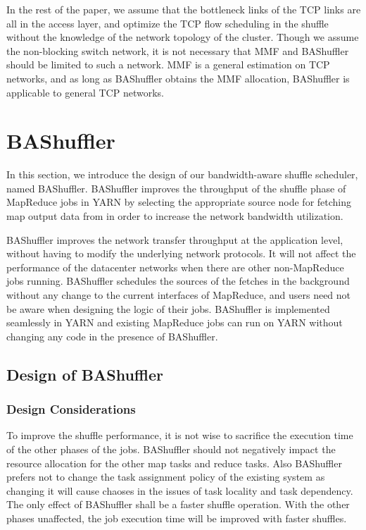 \documentclass[10pt,journal,compsoc]{IEEEtran}
\begin{document}
In the rest of the paper, we assume that the bottleneck links of the
TCP links are all in the access layer,
and optimize the TCP flow scheduling in the shuffle without the
knowledge of the network topology of the cluster.
Though we assume the non-blocking switch network, it is not necessary that MMF and BAShuffler should be limited to such a network. 
MMF is a general estimation on TCP networks, and as long as BAShuffler obtains the MMF allocation, 
BAShuffler is applicable to general TCP networks. 


\section{BAShuffler}\label{section:bashuffler}
In this section, we introduce the design of our
bandwidth-aware shuffle scheduler, named BAShuffler. 
BAShuffler improves the throughput of the shuffle phase of MapReduce jobs in
YARN by selecting the appropriate source node
for fetching map output data from in order to increase the network bandwidth
utilization.

BAShuffler improves the network transfer throughput at the application level, 
without having to modify the underlying network protocols. 
It will not affect the performance of the datacenter networks when
there are other non-MapReduce jobs running. 
BAShuffler schedules the sources of the fetches in the background
without any change to the current interfaces of MapReduce, and
users need not be aware when designing the logic of their jobs.
BAShuffler is implemented seamlessly in YARN and
existing MapReduce jobs can run on YARN without changing any code
in the presence of BAShuffler.

\subsection{Design of BAShuffler}
\subsubsection{Design Considerations}
To improve the shuffle performance, it is not wise to sacrifice 
the execution time of the other phases of the jobs. 
BAShuffler should not negatively impact the resource allocation for the other map tasks
and reduce tasks. 
Also BAShuffler prefers not to change the task assignment policy of the existing system
as changing it will cause chaoses in the issues of task locality and task dependency. 
The only effect of BAShuffler shall be a faster shuffle operation. 
With the other phases unaffected, the job execution time will be improved with faster shuffles.
\end{document}
